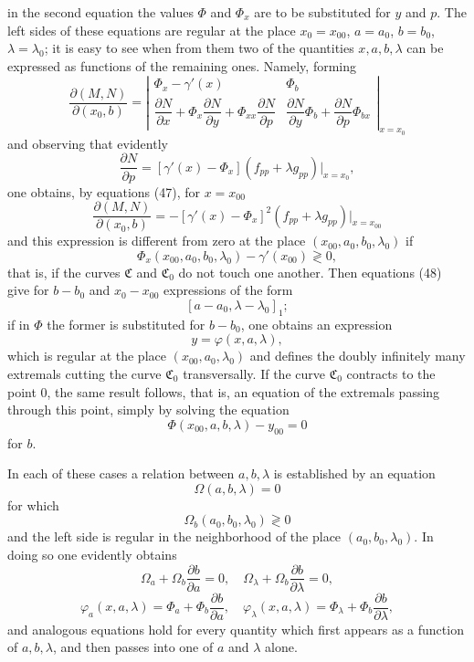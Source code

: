 \documentclass[11pt,a4paper,leqno]{article}
\begin{document}
in the second equation the values $\Phi$ and $\Phi_x$ are to be substituted for $y$ and $p$. The left sides of these equations are regular at the place $x_0=x_{00}$, $a=a_0$, $b=b_0$, $\lambda=\lambda_0$; it is easy to see when from them two of the quantities $x,a,b,\lambda$ can be expressed as functions of the remaining ones. Namely, forming
\[
\frac{\partial(M,N)}{\partial(x_0,b)}=
\left|\begin{array}{cc}
\Phi_x-\gamma'(x)&\Phi_b\\[.6ex]
\dfrac{\partial N}{\partial x}+\Phi_x\dfrac{\partial N}{\partial y}+\Phi_{xx}\dfrac{\partial N}{\partial p}&
\dfrac{\partial N}{\partial y}\Phi_b+\dfrac{\partial N}{\partial p}\Phi_{bx}
\end{array}\right|_{x=x_0}
\]
and observing that evidently
\[
\frac{\partial N}{\partial p}=[\gamma'(x)-\Phi_x](f_{pp}+\lambda g_{pp})\big|_{x=x_0},
\]
one obtains, by equations (47), for $x=x_{00}$
\[
\frac{\partial(M,N)}{\partial(x_0,b)}=-[\gamma'(x)-\Phi_x]^2(f_{pp}+\lambda g_{pp})\big|_{x=x_{00}}
\]
and this expression is different from zero at the place $(x_{00},a_0,b_0,\lambda_0)$ if
\[
\Phi_x(x_{00},a_0,b_0,\lambda_0)-\gamma'(x_{00})\gtrless 0,
\]
that is, if the curves $\mathfrak{C}$ and $\mathfrak{C}_0$ do not touch one another. Then equations (48) give for $b-b_0$ and $x_0-x_{00}$ expressions of the form
\[
[a-a_0,\lambda-\lambda_0]_1;
\]
if in $\Phi$ the former is substituted for $b-b_0$, one obtains an expression
\begin{equation}\tag{49}
y=\varphi(x,a,\lambda),
\end{equation}
which is regular at the place $(x_{00},a_0,\lambda_0)$ and defines the doubly infinitely many extremals cutting the curve $\mathfrak{C}_0$ transversally. If the curve $\mathfrak{C}_0$ contracts to the point 0, the same result follows, that is, an equation of the extremals passing through this point, simply by solving the equation
\begin{equation}\tag{50}
\Phi(x_{00},a,b,\lambda)-y_{00}=0
\end{equation}
for $b$.

In each of these cases a relation between $a,b,\lambda$ is established by an equation
\begin{equation}\tag{51}
\Omega(a,b,\lambda)=0
\end{equation}
for which
\begin{equation}\tag{52}
\Omega_b(a_0,b_0,\lambda_0)\gtrless 0
\end{equation}
and the left side is regular in the neighborhood of the place $(a_0,b_0,\lambda_0)$. In doing so one evidently obtains
\[
\Omega_a+\Omega_b\frac{\partial b}{\partial a}=0,
\quad
\Omega_\lambda+\Omega_b\frac{\partial b}{\partial \lambda}=0,
\]
\[
\varphi_a(x,a,\lambda)=\Phi_a+\Phi_b\frac{\partial b}{\partial a},
\quad
\varphi_\lambda(x,a,\lambda)=\Phi_\lambda+\Phi_b\frac{\partial b}{\partial\lambda},
\]
and analogous equations hold for every quantity which first appears as a function of $a,b,\lambda$, and then passes into one of $a$ and $\lambda$ alone.
\end{document}

